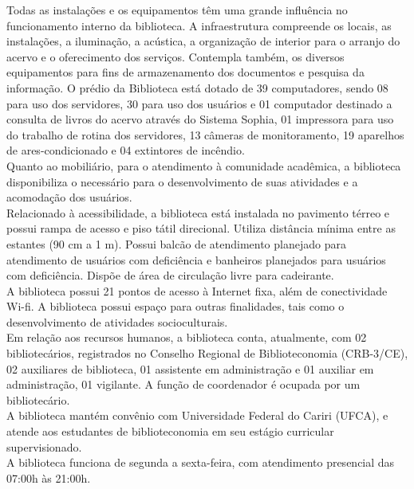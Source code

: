 Todas as instalações e os equipamentos têm uma grande influência no funcionamento interno da biblioteca. A infraestrutura compreende os locais, as instalações, a iluminação, a acústica, a organização de interior para o arranjo do acervo e o oferecimento dos serviços. Contempla também, os diversos equipamentos para fins de armazenamento dos documentos e pesquisa da informação. O prédio da Biblioteca está dotado de 39 computadores, sendo 08 para uso dos servidores, 30 para uso dos usuários e 01 computador destinado a consulta de livros do acervo através do Sistema Sophia, 01 impressora para uso do trabalho de rotina dos servidores, 13 câmeras de monitoramento, 19 aparelhos de ares-condicionado e 04 extintores de incêndio.\\

Quanto ao mobiliário, para o atendimento à comunidade acadêmica, a biblioteca disponibiliza o necessário para o desenvolvimento de suas atividades e a acomodação dos usuários.\\

Relacionado à acessibilidade, a biblioteca está instalada no pavimento térreo e possui rampa de acesso e piso tátil direcional. Utiliza distância mínima entre as estantes (90 cm a 1 m). Possui balcão de atendimento planejado para atendimento de usuários com deficiência e banheiros planejados para usuários com deficiência. Dispõe de área de circulação livre para cadeirante.\\

A biblioteca possui 21 pontos de acesso à Internet fixa, além de conectividade Wi-fi. A biblioteca possui espaço para outras finalidades, tais como o desenvolvimento de atividades socioculturais.\\

Em relação aos recursos humanos, a biblioteca conta, atualmente, com 02 bibliotecários, registrados no Conselho Regional de Biblioteconomia (CRB-3/CE), 02 auxiliares de biblioteca, 01 assistente em administração e 01 auxiliar em administração, 01 vigilante. A função de coordenador é ocupada por um bibliotecário.\\

A biblioteca mantém convênio com Universidade Federal do Cariri (UFCA), e atende aos estudantes de biblioteconomia em seu estágio curricular supervisionado.\\

A biblioteca funciona de segunda a sexta-feira, com atendimento presencial das 07:00h às 21:00h.\\

